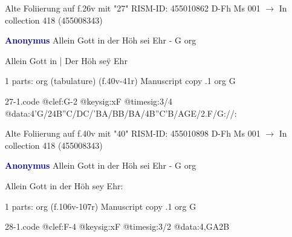 \documentclass[twocolumn]{book}
\begin{document}
\newline Alte Foliierung auf f.26v mit "27"
\newline RISM-ID: 455010862
\newline D-Fh  Ms 001
\newline $\rightarrow$ In collection 418 (455008343)
      
\newline \par \vspace{7pt} \textcolor{darkblue}{\textbf{Anonymus  }}
\newline Allein Gott in der Höh sei Ehr - G
\newline org
\newline \begin{itshape}[f.40v, at left:] Allein Gott in | Der Höh seÿ Ehr\end{itshape} 
\newline \textcolor{darkblue}{}  1 parts: org (tabulature)  (f.40v-41r)
\newline Manuscript copy
.1  org  G  
\begin{filecontents*}{27-1.code}
@clef:G-2
@keysig:xF
@timesig:3/4
@data:4'G/24B''C/DC/'BA/BB/BA/4B''C'B/AGE/2.F/G://:
\end{filecontents*}
\newline
%

\newline Alte Foliierung auf f.40v mit "40"
\newline RISM-ID: 455010898
\newline D-Fh  Ms 001
\newline $\rightarrow$ In collection 418 (455008343)
      
\newline \par \vspace{7pt} \textcolor{darkblue}{\textbf{Anonymus  }}
\newline Allein Gott in der Höh sei Ehr - G
\newline org
\newline \begin{itshape}[f.106v, heading:] Allein Gott in der Höh sey Ehr:\end{itshape} 
\newline \textcolor{darkblue}{}  1 parts: org  (f.106v-107r)
\newline Manuscript copy
.1  org  G  
\begin{filecontents*}{28-1.code}
@clef:F-4
@keysig:xF
@timesig:3/2
@data:4,GA2B%
\end{filecontents*}
\newline
%
\end{document}
